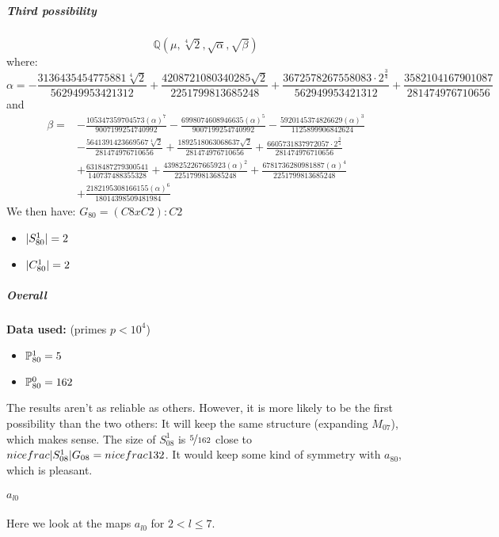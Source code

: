 \subparagraph{Third possibility}
$$\mathbb{Q}\left(\mu, \sqrt[4]{2}, \sqrt{\alpha}, \sqrt{\beta}\right)$$
where:
$$\alpha = - \frac{3136435454775881 \sqrt[4]{2}}{562949953421312} + \frac{4208721080340285 \sqrt{2}}{2251799813685248} + \frac{3672578267558083 \cdot 2^{\frac{3}{4}}}{562949953421312} + \frac{3582104167901087}{281474976710656}$$
and 
\begin{align*}
	\beta = 
	&- \frac{105347359704573 \left(\alpha\right)^{7}}{9007199254740992} 
	- \frac{6998074608946635 \left(\alpha\right)^{5}}{9007199254740992} 
	- \frac{5920145374826629 \left(\alpha\right)^{3}}{1125899906842624} 
	\\
	&- \frac{5641391423669567 \sqrt[4]{2}}{281474976710656} 
	+ \frac{1892518063068637 \sqrt{2}}{281474976710656} 
	+ \frac{6605731837972057 \cdot 2^{\frac{3}{4}}}{281474976710656} 
	\\
	&+ \frac{6318487279300541}{140737488355328} 
	+ \frac{4398252267665923 \left(\alpha\right)^{2}}{2251799813685248} 
	+ \frac{6781736280981887 \left(\alpha\right)^{4}}{2251799813685248} 
	\\
	&+ \frac{2182195308166155 \left(\alpha\right)^{6}}{18014398509481984}
\end{align*}
We then have:
$G_{80} =(C8 x C2) : C2$
\begin{itemize}
	\item $| S_{80}^1 | = 2$
	\item $| C_{80}^1 | = 2$
\end{itemize}
\subparagraph{Overall}
\textbf{Data used:} (primes $p<10^4$)
\begin{itemize}
	\item $\mathbb{P}_{80}^1 = 5$
	\item $\mathbb{P}_{80}^0 = 162$
\end{itemize}
The results aren't as reliable as others. However, it is more likely to be the first possibility than the two others:
It will keep the same structure (expanding $M_{07}$), which makes sense.
The size of $S_{08}^1$ is $\nicefrac{5}{162}$ close to $nicefrac{| S_{08}^1 |}{G_{08}} = nicefrac{1}{32}$.
It would keep some kind of symmetry with $a_{80}$, which is pleasant.

\paragraph{{\LARGE $a_{l0}$}}
Here we look at the maps $a_{l0}$ for $2 < l \leq 7$.
